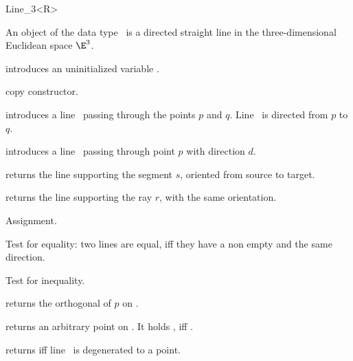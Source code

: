 \begin{ccRefClass} {Line_3<R>}

\ccDefinition
An object  of the data type \ccRefName\ is a directed
straight line in the three-dimensional Euclidean space $\E^3$.

\ccCreation
{}

\ccHidden {}
             {introduces an uninitialized variable \ccVar.}

\ccHidden {}
 	    {copy constructor.}

            {introduces a line \ccVar\ passing through the points $p$ and $q$. 
             Line \ccVar\ is directed from $p$ to $q$.}


            {introduces a line \ccVar\ passing through point $p$ with 
             direction $d$.}

            {returns the line supporting the segment $s$,
	    oriented from source to target.}

            {returns the line supporting the ray $r$, with the
	    same orientation.}

\ccOperations
{}

\ccHidden {}
        {Assignment.}

       {Test for equality: two lines are equal, iff they have a non 
        empty  and the same direction.}

       {Test for inequality.}

       {returns the orthogonal  of $p$ on \ccVar.}

       {returns an arbitrary point on \ccVar. It holds 
        , iff .}

\ccPredicates

       {returns  iff line \ccVar\ is degenerated to a point.}


\end{ccRefClass}

